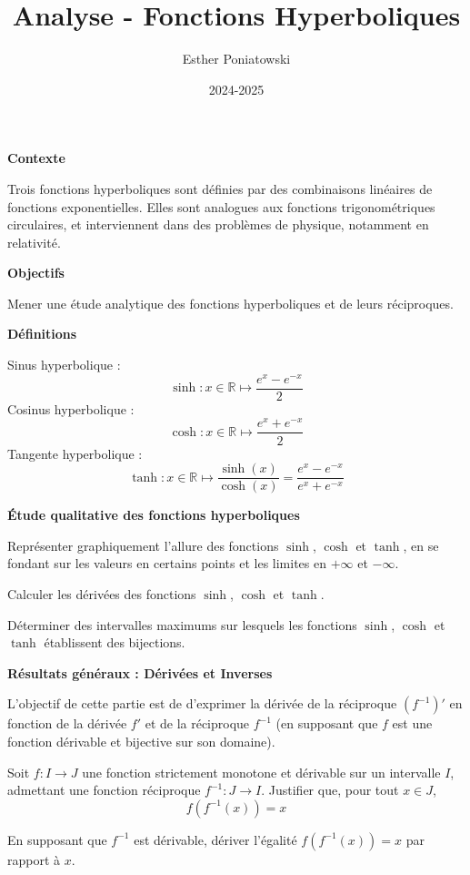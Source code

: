 \documentclass[10pt,a4paper]{article}
\title{Analyse - Fonctions Hyperboliques}
\author{Esther Poniatowski}
\date{2024-2025}
\begin{document}
\textbf{Contexte}

Trois fonctions hyperboliques sont définies par des combinaisons linéaires de fonctions
exponentielles. Elles sont analogues aux fonctions trigonométriques circulaires, et interviennent
dans des problèmes de physique, notamment en relativité.

\bigskip
\textbf{Objectifs}

Mener une étude analytique des fonctions hyperboliques et de leurs réciproques.

\bigskip
\textbf{Définitions}

Sinus hyperbolique :
\[
\sinh : x \in \mathbb{R} \mapsto \frac{e^x - e^{-x}}{2}
\]
Cosinus hyperbolique :
\[
\cosh : x \in \mathbb{R} \mapsto \frac{e^x + e^{-x}}{2}
\]
Tangente hyperbolique :
\[
\tanh : x \in \mathbb{R} \mapsto \frac{\sinh(x)}{\cosh(x)} = \frac{e^x - e^{-x}}{e^x + e^{-x}}
\]

\bigskip
\textbf{Étude qualitative des fonctions hyperboliques}

\q Représenter graphiquement l'allure des fonctions $\sinh$, $\cosh$ et $\tanh$, en se fondant sur
les valeurs en certains points et les limites en $+\infty$ et $-\infty$.

\q Calculer les dérivées des fonctions $\sinh$, $\cosh$ et $\tanh$.

\q Déterminer des intervalles maximums sur lesquels les fonctions $\sinh$, $\cosh$ et $\tanh$
établissent des bijections.

\bigskip
\textbf{Résultats généraux : Dérivées et Inverses}

L'objectif de cette partie est de d'exprimer la dérivée de la réciproque $(f^{-1})'$ en fonction de
la dérivée $f'$ et de la réciproque $f^{-1}$ (en supposant que \( f \) est une fonction dérivable et
bijective sur son domaine).

\q Soit \( f : I \to J \) une fonction strictement monotone et dérivable sur un intervalle \( I \),
admettant une fonction réciproque \( f^{-1} : J \to I \). Justifier que, pour tout \( x \in J \),
\[
f(f^{-1}(x)) = x
\]

\q En supposant que \( f^{-1} \) est dérivable, dériver l'égalité \( f(f^{-1}(x)) = x \) par rapport
à \( x \).
\end{document}
